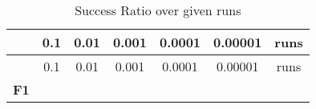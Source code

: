 \documentclass[12pt,a4paper]{article}
\begin{document}
\begin{longtable}[c]{@{}ccccccc@{}}
\caption{Success Ratio over given runs}\tabularnewline
\toprule
\begin{minipage}[b]{0.11\columnwidth}\centering\strut
~
\strut\end{minipage} &
\begin{minipage}[b]{0.07\columnwidth}\centering\strut
0.1
\strut\end{minipage} &
\begin{minipage}[b]{0.08\columnwidth}\centering\strut
0.01
\strut\end{minipage} &
\begin{minipage}[b]{0.09\columnwidth}\centering\strut
0.001
\strut\end{minipage} &
\begin{minipage}[b]{0.10\columnwidth}\centering\strut
0.0001
\strut\end{minipage} &
\begin{minipage}[b]{0.11\columnwidth}\centering\strut
0.00001
\strut\end{minipage} &
\begin{minipage}[b]{0.07\columnwidth}\centering\strut
runs
\strut\end{minipage}\tabularnewline
\midrule
\endfirsthead
\toprule
\begin{minipage}[b]{0.11\columnwidth}\centering\strut
~
\strut\end{minipage} &
\begin{minipage}[b]{0.07\columnwidth}\centering\strut
0.1
\strut\end{minipage} &
\begin{minipage}[b]{0.08\columnwidth}\centering\strut
0.01
\strut\end{minipage} &
\begin{minipage}[b]{0.09\columnwidth}\centering\strut
0.001
\strut\end{minipage} &
\begin{minipage}[b]{0.10\columnwidth}\centering\strut
0.0001
\strut\end{minipage} &
\begin{minipage}[b]{0.11\columnwidth}\centering\strut
0.00001
\strut\end{minipage} &
\begin{minipage}[b]{0.07\columnwidth}\centering\strut
runs
\strut\end{minipage}\tabularnewline
\midrule
\endhead
\begin{minipage}[t]{0.11\columnwidth}\centering\strut
\textbf{F1}
\strut\end{minipage} &

\end{longtable}
\end{document}
